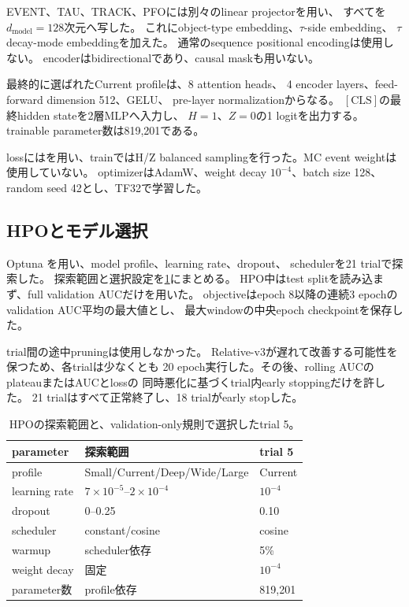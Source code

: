 \documentclass[xelatex,ja=standard,a4paper,10pt,twocolumn]{bxjsarticle}
\begin{document}
EVENT、TAU、TRACK、PFOには別々のlinear projectorを用い、
すべてを\(d_{\mathrm{model}}=128\)次元へ写した。
これにobject-type embedding、\(\tau\)-side embedding、
\(\tau\) decay-mode embeddingを加えた。
通常のsequence positional encodingは使用しない。
encoderはbidirectionalであり、causal maskも用いない。

最終的に選ばれたCurrent profileは、8 attention heads、
4 encoder layers、feed-forward dimension 512、GELU、
pre-layer normalizationからなる。
\([\mathrm{CLS}]\)の最終hidden stateを2層MLPへ入力し、
\(H=1\)、\(Z=0\)の1 logitを出力する。trainable parameter数は819,201である。

lossにはを用い、trainではH/Z balanced
samplingを行った。MC event weightは使用していない。
optimizerはAdamW、weight decay \(10^{-4}\)、batch size 128、
random seed 42とし、TF32で学習した。

\subsection{HPOとモデル選択}
\label{subsec:model_selection}

Optuna \cite{Optuna}を用い、model profile、learning rate、dropout、
schedulerを21 trialで探索した。
探索範囲と選択設定を\cref{tab:hpo}にまとめる。
HPO中はtest splitを読み込まず、full validation AUCだけを用いた。
objectiveはepoch 8以降の連続3 epochのvalidation AUC平均の最大値とし、
最大windowの中央epoch checkpointを保存した。

trial間の途中pruningは使用しなかった。
Relative-v3が遅れて改善する可能性を保つため、各trialは少なくとも
20 epoch実行した。その後、rolling AUCのplateauまたはAUCとlossの
同時悪化に基づくtrial内early stoppingだけを許した。
21 trialはすべて正常終了し、18 trialがearly stopした。

\begin{table}[t]
  \centering
  \caption{HPOの探索範囲と、validation-only規則で選択したtrial 5。}
  \label{tab:hpo}
  \small
  \begin{tabularx}{\columnwidth}{@{}l X l@{}}
    \toprule
    parameter & 探索範囲 & trial 5 \\
    \midrule
    profile & Small/Current/Deep/\newline Wide/Large & Current \\
    learning rate & \(7\times10^{-5}\)--\(2\times10^{-4}\) & \(10^{-4}\) \\
    dropout & 0--0.25 & 0.10 \\
    scheduler & constant/cosine & cosine \\
    warmup & scheduler依存 & 5\% \\
    weight decay & 固定 & \(10^{-4}\) \\
    parameter数 & profile依存 & 819,201 \\
    \bottomrule
  \end{tabularx}
\end{table}
\end{document}

